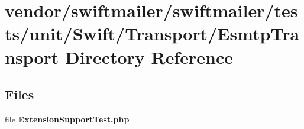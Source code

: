 \section{vendor/swiftmailer/swiftmailer/tests/unit/\+Swift/\+Transport/\+Esmtp\+Transport Directory Reference}
\label{dir_f0ecae36f75781bc8667be50e4afe57a}
\subsection*{Files}
\begin{DoxyCompactItemize}
\item 
file {\bf Extension\+Support\+Test.\+php}
\end{DoxyCompactItemize}
